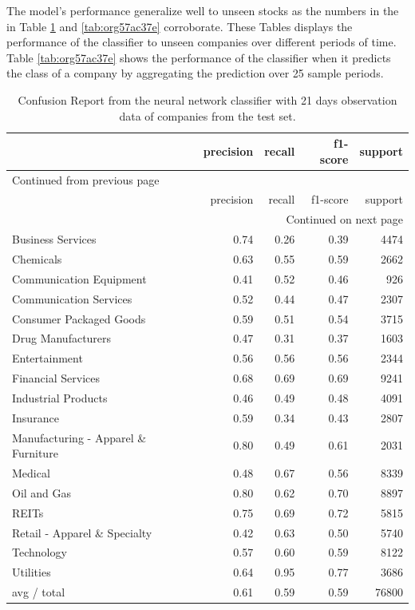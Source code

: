 \documentclass[a4paper,twoside]{article}
\begin{document}
The model's performance generalize well to unseen stocks as the numbers in the
in Table \ref{tab:org9c87c36} and \ref{tab:org57ac37e} corroborate.
These Tables displays the performance of the classifier to unseen companies
over different periods of time. Table \ref{tab:org57ac37e} shows the
performance of the classifier when it predicts the class of a company by
aggregating the prediction over 25 sample periods.


\begin{longtable}{|l|rrrr|}
\caption{\label{tab:org9c87c36}
Confusion Report from the neural network classifier with 21 days observation data of companies from the test set.}
\\
\hline
 & precision & recall & f1-score & support\\
\hline
\endfirsthead
\multicolumn{5}{l}{Continued from previous page} \\
\hline

 & precision & recall & f1-score & support \\

\hline
\endhead
\hline\multicolumn{5}{r}{Continued on next page} \\
\endfoot
\endlastfoot
\hline
Business Services & 0.74 & 0.26 & 0.39 & 4474\\
Chemicals & 0.63 & 0.55 & 0.59 & 2662\\
Communication Equipment & 0.41 & 0.52 & 0.46 & 926\\
Communication Services & 0.52 & 0.44 & 0.47 & 2307\\
Consumer Packaged Goods & 0.59 & 0.51 & 0.54 & 3715\\
Drug Manufacturers & 0.47 & 0.31 & 0.37 & 1603\\
Entertainment & 0.56 & 0.56 & 0.56 & 2344\\
Financial Services & 0.68 & 0.69 & 0.69 & 9241\\
Industrial Products & 0.46 & 0.49 & 0.48 & 4091\\
Insurance & 0.59 & 0.34 & 0.43 & 2807\\
Manufacturing - Apparel \& Furniture & 0.80 & 0.49 & 0.61 & 2031\\
Medical & 0.48 & 0.67 & 0.56 & 8339\\
Oil and Gas & 0.80 & 0.62 & 0.70 & 8897\\
REITs & 0.75 & 0.69 & 0.72 & 5815\\
Retail - Apparel \& Specialty & 0.42 & 0.63 & 0.50 & 5740\\
Technology & 0.57 & 0.60 & 0.59 & 8122\\
Utilities & 0.64 & 0.95 & 0.77 & 3686\\
\hline
avg / total & 0.61 & 0.59 & 0.59 & 76800\\
\hline
\end{longtable}
\end{document}

